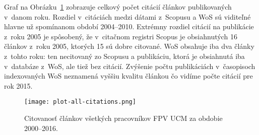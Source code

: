 Graf na Obrázku~\ref{fig:plot.all.citations} zobrazuje celkový počet citácií
článkov publikovaných v~danom roku.  Rozdiel v~citáciách medzi dátami z~Scopusu
a WoS sú viditeľné hlavne už spomínanom období 2004--2010.  Extrémny rozdiel
citácií na publikácie z~roku 2005 je spôsobený, že v~citačnom registri Scopus je
obsiahnutých 16 článkov z~roku 2005, ktorých 15 sú dobre citované.  WoS obsahuje
iba dva články z~tohto roku: ten necitovaný zo Scopusu a publikáciu, ktorá je
obsiahnutá iba v~databáze z~WoS, ale tiež bez citácií.  Zvýšenie počtu
publikáciách v~časopisoch indexovaných WoS neznamená vyššiu kvalitu článkou čo
vidíme počte citácií pre rok 2015.

\begin{figure}
  \centering
  \texttt{[image: plot-all-citations.png]}
  \caption{Citovanosť článkov všetkých pracovníkov FPV UCM za obdobie
    2000--2016.}
  \label{fig:plot.all.citations}
\end{figure}

